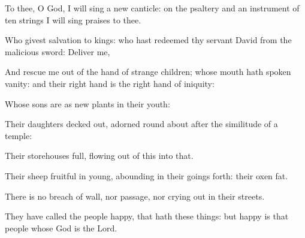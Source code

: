 ﻿\item To thee, O God, I will sing a new canticle: on the psaltery and an instrument of ten strings I will sing praises to thee.
\item Who givest salvation to kings: who hast redeemed thy servant David from the malicious sword: Deliver me,
\item And rescue me out of the hand of strange children; whose mouth hath spoken vanity: and their right hand is the right hand of iniquity:
\item Whose sons are as new plants in their youth:
\item Their daughters decked out, adorned round about after the similitude of a temple:
\item Their storehouses full, flowing out of this into that.
\item Their sheep fruitful in young, abounding in their goings forth: their oxen fat.
\item There is no breach of wall, nor passage, nor crying out in their streets.
\item They have called the people happy, that hath these things: but happy is that people whose God is the Lord.